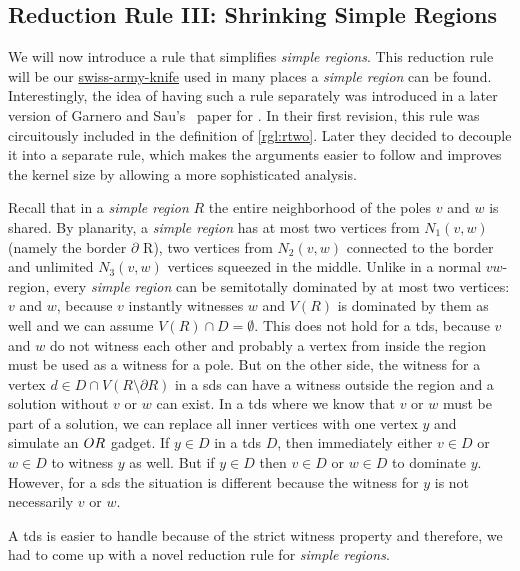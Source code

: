 \subsection{Reduction Rule III: Shrinking Simple Regions}

We will now introduce a rule that simplifies \textit{simple regions}.
This reduction rule will be our \href{https://en.wikipedia.org/wiki/Swiss_Army_knife}{swiss-army-knife} used in many places a \textit{simple region} can be found.
Interestingly, the idea of having such a rule separately was introduced in a later version of Garnero and Sau's~\cite{Garnero2018} paper for \ptdom.
In their first revision, this rule was circuitously included in the definition of \cref{rgl:rtwo}.
Later they decided to decouple it into a separate rule, which makes the arguments easier to follow and improves the kernel size by allowing a more sophisticated analysis.

Recall that in a \textit{simple region} $R$ the entire neighborhood of the poles $v$ and $w$ is shared.  
By planarity, a \textit{simple region} has at most two vertices from $N_1(v,w)$ (namely the border $\partial$ R), two vertices from $N_2(v,w)$ connected to the border and unlimited $N_3(v,w)$ vertices squeezed in the middle.
Unlike in a normal $vw$-region, every \textit{simple region} can be semitotally dominated by at most two vertices: $v$ and $w$, because $v$ instantly witnesses $w$ and $V(R)$ is dominated by them as well and we can assume $V(R) \cap D = \emptyset$.
This does not hold for a tds, because $v$ and $w$ do not witness each other and probably a vertex from inside the region must be used as a witness for a pole.
But on the other side, the witness for a vertex $d \in D \cap V(R \setminus \partial R)$ in a sds can have a witness outside the region and a solution without $v$ or $w$ can exist. 
In a tds where we know that $v$ or $w$ must be part of a solution, we can replace all inner vertices with one vertex $y$ and simulate an $\mathnormal{OR}$ gadget.
If $y \in D$ in a tds $D$, then immediately either $v \in D$ or $w \in D$ to witness $y$ as well. But if $y \in D$ then $v \in D$ or $w \in D$ to dominate $y$.
However, for a sds the situation is different because the witness for $y$ is not necessarily $v$ or $w$.

A tds is easier to handle because of the strict witness property and therefore, we had to come up with a novel reduction rule for \textit{simple regions}.


